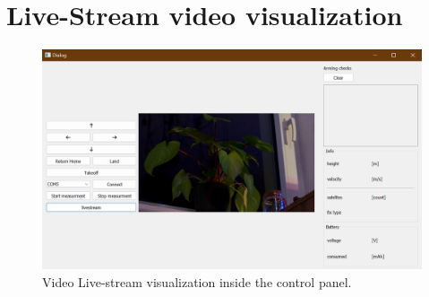 \section{Live-Stream video visualization}
\label{sec:appendix_livestream}
\begin{figure}[htpb]
    \centering
    \includegraphics[scale=0.5]{drone_control_panel_live_stream.png}
    \caption[Video Live-stream visualization]{Video Live-stream visualization
    inside the control panel.}
    \label{fig:4_control_panel_live_stream}
\end{figure}
